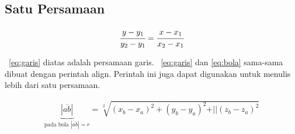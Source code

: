\chapter{\babTiga}


\section{Satu Persamaan}

\noindent \begin{align}\label{eq:garis}
	\cfrac{y - y_{1}}{y_{2} - y_{1}} = 
	\cfrac{x - x_{1}}{x_{2} - x_{1}}
\end{align}

\equ~\ref{eq:garis} diatas adalah persamaan garis. 
\equ~\ref{eq:garis} dan \ref{eq:bola} sama-sama dibuat dengan perintah \bslash
align. 
Perintah ini juga dapat digunakan untuk menulis lebih dari satu persamaan. 

\noindent \begin{align}\label{eq:bola}
	\underbrace{|\overline{ab}|}_{\text{pada bola $|\overline{ab}| = r$}} 
		= \sqrt[2]{(x_{b} - x_{a})^{2} + (y_{b} - y_{a})^{2} + 
				\vert\vert(z_{b} - z_{a})^{2}}
\end{align}

